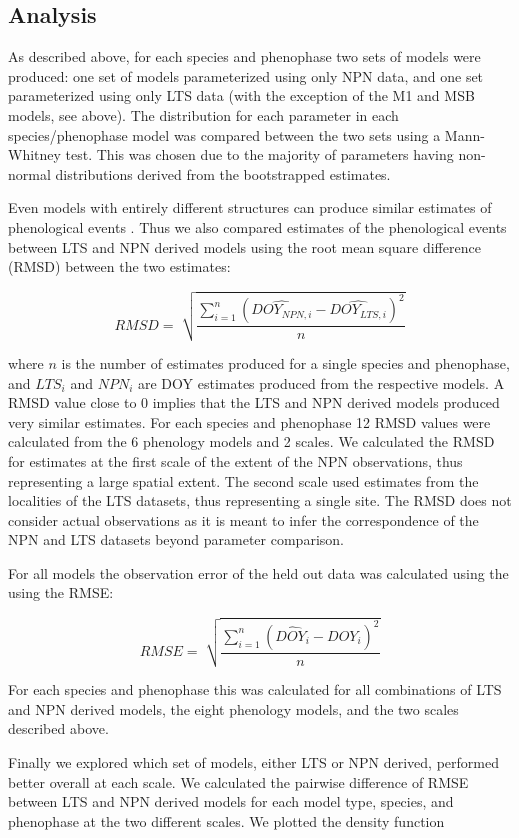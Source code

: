 \documentclass[fleqn,10pt,lineno]{wlpeerj} %
\begin{document}
\subsection*{Analysis}

As described above, for each species and phenophase two sets of models were produced: one set of models parameterized using only NPN data, and one set parameterized using only LTS data (with the exception of the M1 and MSB models, see above). The distribution for each parameter in each species/phenophase model was compared between the two sets using a Mann-Whitney test. This was chosen due to the majority of parameters having non-normal distributions derived from the bootstrapped estimates. 

Even models with entirely different structures can produce similar estimates of phenological events \citep{basler2016}. Thus we also compared estimates of the phenological events between LTS and NPN derived models using the root mean square difference (RMSD) between the two estimates:

$$ RMSD = \sqrt[]{ \frac{\sum_{i=1}^{n}(\widehat{DOY_{NPN,i}} - \widehat{DOY_{LTS,i}})^{2}}{n}} $$

where $n$ is the number of estimates produced for a single species and phenophase, and $LTS_{i}$ and $NPN_{i}$ are DOY estimates produced from the respective models. A RMSD value close to 0 implies that the LTS and NPN derived models produced very similar estimates. For each species and phenophase 12 RMSD values were calculated from the 6 phenology models and 2 scales. We calculated the RMSD for estimates at the first scale of the extent of the NPN observations, thus representing a large spatial extent. The second scale used estimates from the localities of the LTS datasets, thus representing a single site. The RMSD does not consider actual observations as it is meant to infer the correspondence of the NPN and LTS datasets beyond parameter comparison. 

For all models the observation error of the held out data was calculated using the using the RMSE:

$$ RMSE = \sqrt[]{ \frac{\sum_{i=1}^{n}(\widehat{DOY_{i}} - DOY_{i})^{2}}{n}} $$

For each species and phenophase this was calculated for all combinations of LTS and NPN derived models, the eight phenology models, and the two scales described above. 

Finally we explored which set of models, either LTS or NPN derived, performed better overall at each scale. We calculated the pairwise difference of RMSE between LTS and NPN derived models for each model type, species, and phenophase at the two different scales. We plotted the density function
\end{document}
